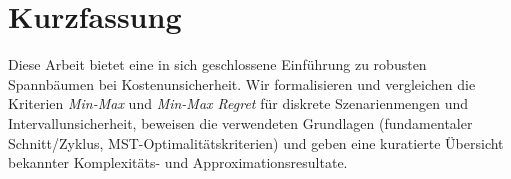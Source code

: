 \chapter*{Kurzfassung}
Diese Arbeit bietet eine in sich geschlossene Einführung zu robusten Spannbäumen bei
Kostenunsicherheit. Wir formalisieren und vergleichen die Kriterien \emph{Min-Max} und
\emph{Min-Max Regret} für diskrete Szenarienmengen und Intervallunsicherheit, beweisen
die verwendeten Grundlagen (fundamentaler Schnitt/Zyklus, MST-Optimalitätskriterien)
und geben eine kuratierte Übersicht bekannter Komplexitäts- und Approximationsresultate.
